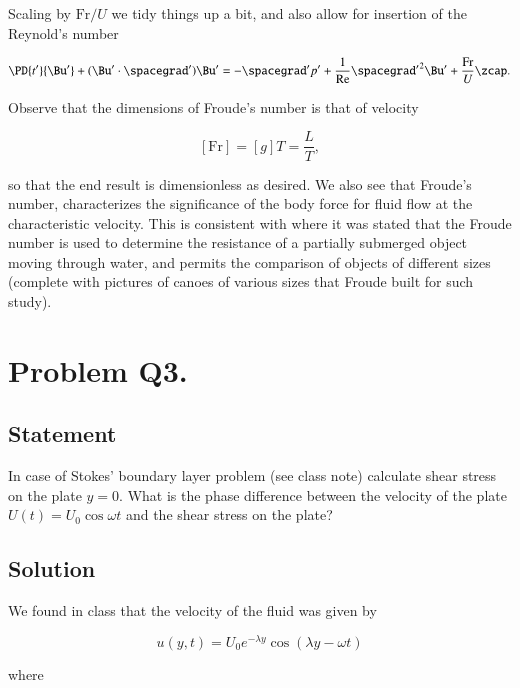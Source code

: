 Scaling by $\text{Fr}/U$ we tidy things up a bit, and also allow for insertion of the Reynold's number

\begin{equation}\label{eqn:continuumL19:330}
\PD{t'}{\Bu'} + (\Bu' \cdot \spacegrad') \Bu' = - \spacegrad' p' + \frac{1}{\text{Re}} {\spacegrad'}^2 \Bu' + \frac{\text{Fr}}{U}\zcap.
\end{equation}

Observe that the dimensions of Froude's number is that of velocity

\begin{equation}\label{eqn:continuumProblemSet3:350}
[\text{Fr}] = [g] T = \frac{L}{T},
\end{equation}

so that the end result is dimensionless as desired.  We also see that Froude's number, characterizes the significance of the body force for fluid flow at the characteristic velocity.  This is consistent with \cite{wiki:froudeNumber} where it was stated that the Froude number is used to determine the resistance of a partially submerged object moving through water, and permits the comparison of objects of different sizes (complete with pictures of canoes of various sizes that Froude built for such study).

\section{Problem Q3.}
\subsection{Statement}

In case of Stokes' boundary layer problem (see class note) calculate shear stress on the plate $y = 0$.   What is the phase difference between the velocity of the plate $U(t) = U_0 \cos\omega t$ and the shear stress on the plate?

\subsection{Solution}

We found in class that the velocity of the fluid was given by

\begin{equation}\label{eqn:continuumL19:370}
u(y, t) = U_0 e^{-\lambda y} \cos(\lambda y - \omega t)
\end{equation}

where

